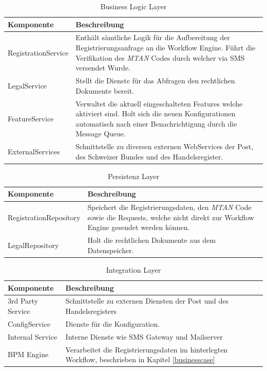 \begin{table}[H]
	\centering
	\caption{Business Logic Layer}
	\begin{tabular}{ | p{4.5cm} | p{10.5cm} | }
		\toprule
		{\textbf{Komponente}} & {\textbf{Beschreibung}} \\
		\midrule
		RegistrationService &  Enthält sämtliche Logik für die Aufbereitung der Registrierungsanfrage an die Workflow Engine. Führt die Verifikation des \textit{\gls{MTAN}} Codes durch welcher via SMS versendet Wurde.\\ \hline
		LegalService &  Stellt die Dienste für das Abfragen den rechtlichen Dokumente bereit. \\ \hline
		FeatureService &  Verwaltet die aktuell eingeschalteten Features welche aktiviert sind. Holt sich die neuen Konfigurationen automatisch nach einer Benachrichtigung durch die Message Queue. \\ \hline
		ExternalServices & Schnittstelle zu diversen externen WebServices der Post, des Schweizer Bundes und des Handelsregister. \\
		\bottomrule
	\end{tabular}
\end{table}

\begin{table}[H]
	\centering
	\caption{Persistenz Layer}
	\begin{tabular}{ | p{4.5cm} | p{10.5cm} | }
		\toprule
		{\textbf{Komponente}} & {\textbf{Beschreibung}} \\
		\midrule
		RegistrationRepository &  Speichert die Registrierungsdaten, den \textit{\gls{MTAN}} Code sowie die Requests, welche nicht direkt zur Workflow Engine gesendet werden können. \\ \hline
		LegalRepository &  Holt die rechtlichen Dokumente aus dem Datenspeicher. \\
		\bottomrule
	\end{tabular}
\end{table}

\begin{table}[H]
	\centering
	\caption{Integration Layer}
	\begin{tabular}{ | p{4.5cm} | p{10.5cm} | }
		\toprule
		{\textbf{Komponente}} & {\textbf{Beschreibung}} \\
		\midrule
		3rd Party Service &  Schnittstelle zu externen Diensten der Post und des Handelsregisters\\ \hline
		ConfigService &  Dienste für die Konfiguration.\\ \hline
		Internal Service &  Interne Dienste wie SMS Gateway und Mailserver\\ \hline
		BPM Engine & Verarbeitet die Registrierungsdaten im hinterlegten Workflow, beschrieben in Kapitel \ref{businesscase}\\
		\bottomrule
	\end{tabular}
\end{table}
\newpage


